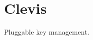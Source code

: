 \documentclass[../xdudla00-porting-Tang-to-Open-WRT.tex]{subfiles}
\begin{document}
\chapter{Clevis}\label{clevis}

Pluggable key management.
\end{document}
